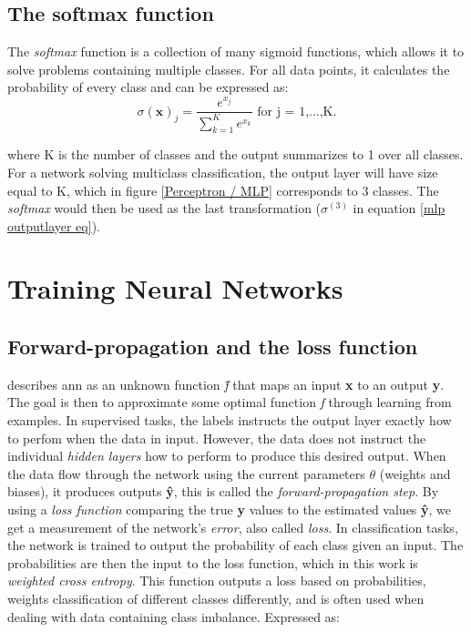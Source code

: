            
    \subsection{The softmax function}
        The \textit{softmax} function is a collection of many sigmoid functions, which allows it to solve problems containing multiple classes\cite{sharma2019new_activation_func}. For all data points, it calculates the probability of every class and can be expressed as:
        \begin{equation}
            \sigma(\textbf{x})_{j} = \dfrac{e^{x_{j}}}{\sum^{K}_{k=1}e^{x_{k}}} \textrm{ for j = 1,...,K.}
        \end{equation}
        
        where K is the number of classes and the output summarizes to 1 over all classes. For a network solving multiclass classification, the output layer will have size equal to K, which in figure \ref{Perceptron / MLP} corresponds to 3 classes. The \textit{softmax} would then be used as the last transformation ($\sigma^{(3)}$ in equation \ref{mlp outputlayer eq}).

\section{Training Neural Networks} \label{training neural networks}

\subsection{Forward-propagation and the loss function}
    \citeauthor{Goodfellow-et-al-2016_NN}\cite{Goodfellow-et-al-2016_NN} describes \gls{ann} as an unknown function \textit{\^{f}} that maps an input \textbf{x} to an output \textbf{y}. The goal is then to approximate some optimal function \textit{f} through learning from examples. In supervised tasks, the labels instructs the output layer exactly how to perfom when the data in input. However, the data does not instruct the individual \textit{hidden layers} how to perform to produce this desired output. When the data flow through the network using the current parameters $\theta$ (weights and biases), it produces outputs \textbf{\^{y}}, this is called the \textit{forward-propagation step}. By using a \textit{loss function} comparing the true \textbf{y} values to the estimated values \textbf{\^{y}}, we get a measurement of the network's \textit{error}, also called \textit{loss}. In classification tasks, the network is trained to output the probability of each class given an input\cite{ho2019real_weighted_cross_entropy}. The probabilities are then the input to the loss function, which in this work is \textit{weighted cross entropy}. This function outputs a loss based on probabilities, weights classification of different classes differently, and is often used when dealing with data containing class imbalance. Expressed as:
    
